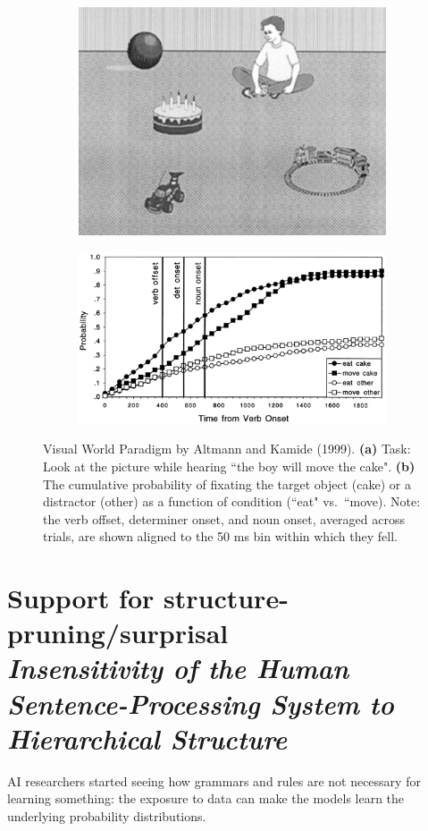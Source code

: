 \begin{figure}[!ht]
    \centering
    \captionsetup{width=.8\linewidth}
    \begin{subfigure}{.42\textwidth}
        \centering
        \captionsetup{width=.8\linewidth}
        \includegraphics[width=.9\linewidth]{images/vwp.png}
        \caption{}
        \label{fig:vwp}
    \end{subfigure}
    \begin{subfigure}{.56\textwidth}
        \centering
        \captionsetup{width=.8\linewidth}
        \includegraphics[width=.9\linewidth]{images/vwp_2.png}
        \caption{}
        \label{fig:vwp_2}
    \end{subfigure}
    \caption{Visual World Paradigm by Altmann and Kamide (1999). \textbf{(a)} Task: Look at the picture while hearing ``the boy will move the cake". \textbf{(b)} The cumulative probability of fixating the target object (cake) or a distractor (other) as a function of condition (``eat" vs.~``move). Note: the verb offset, determiner onset, and noun onset, averaged across trials, are shown aligned to the 50 ms bin within which they fell.}
    \label{fig:vwp_1}
\end{figure}

\section[Support for structure-pruning/surprisal]{Support for structure-pruning/surprisal\\ \textit{Insensitivity of the Human Sentence-Processing System to Hierarchical Structure}\\
}
AI researchers started seeing how grammars and rules are not necessary for learning something: the exposure to data can make the models learn the underlying probability distributions.
